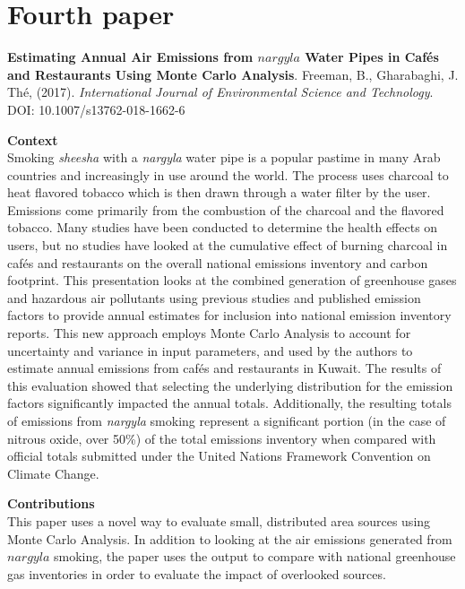 \section{Fourth paper}
\noindent
\textbf{Estimating Annual Air Emissions from $nargyla$ Water Pipes in Caf\'es and Restaurants Using Monte Carlo Analysis}. Freeman, B., Gharabaghi, J.  Th\'e, (2017). \textit{International Journal of Environmental Science and Technology}. DOI: 10.1007/s13762-018-1662-6

\vspace{5mm}
\noindent
\textbf{Context}\\
\noindent
Smoking \textit{sheesha} with a \textit{nargyla} water pipe is a popular pastime in many Arab countries and increasingly in use around the world.  The process uses charcoal to heat flavored tobacco which is then drawn through a water filter by the user.  Emissions come primarily from the combustion of the charcoal and the flavored tobacco.  Many studies have been conducted to determine the health effects on users, but no studies have looked at the cumulative effect of burning charcoal in caf\'es and restaurants on the overall national emissions inventory and carbon footprint.  This presentation looks at the combined generation of greenhouse gases and hazardous air pollutants using previous studies and published emission factors to provide annual estimates for inclusion into national emission inventory reports.  This new approach employs Monte Carlo Analysis to account for uncertainty and variance in input parameters, and used by the authors to estimate annual emissions from cafés and restaurants in Kuwait.  The results of this evaluation showed that selecting the underlying distribution for the emission factors significantly impacted the annual totals.  Additionally, the resulting totals of emissions from \textit{nargyla} smoking represent a significant portion (in the case of nitrous oxide, over 50\%) of the total emissions inventory when compared with official totals submitted under the United Nations Framework Convention on Climate Change.

\vspace{5mm}
\noindent
\textbf{Contributions}\\
\noindent
This paper uses a novel way to evaluate small, distributed area sources using Monte Carlo Analysis. In addition to looking at the air emissions generated from $nargyla$ smoking, the paper uses the output to compare with national greenhouse gas inventories in order to evaluate the impact of overlooked sources.

